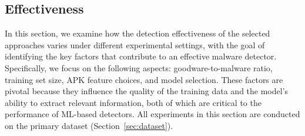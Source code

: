 \subsection{Effectiveness}
\label{effectiveness}
In this section, we examine how the detection effectiveness of the selected approaches varies under different experimental settings, with the goal of identifying the key factors that contribute to an effective malware detector.
Specifically, we focus on the following aspects: goodware-to-malware ratio, training set size, APK feature choices, and model selection.
These factors are pivotal because they influence the quality of the training data and the model's ability to extract relevant information, both of which are critical to the performance of ML-based detectors.
All experiments in this section are conducted on the primary dataset (Section~\ref{sec:dataset}).

